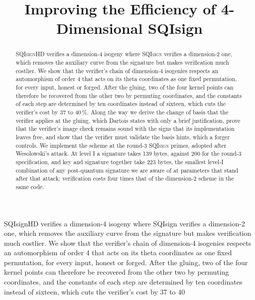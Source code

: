 \documentclass[version=preprint]{iacrcc}
\title{Improving the Efficiency of 4-Dimensional SQIsign}
\newcommand{\SQIsign}{SQI{\textsc{sign}}}
\begin{document}
    \maketitle

    \begin{textabstract}
SQIsignHD verifies a dimension-4 isogeny where SQIsign verifies a dimension-2 one, which removes the auxiliary curve from the signature but makes verification much costlier. We show that the verifier's chain of dimension-4 isogenies respects an automorphism of order 4 that acts on its theta coordinates as one fixed permutation, for every input, honest or forged. After the gluing, two of the four kernel points can therefore be recovered from the other two by permuting coordinates, and the constants of each step are determined by ten coordinates instead of sixteen, which cuts the verifier's cost by 37 to 40%
    \end{textabstract}

    \begin{abstract}
        {\SQIsign HD} verifies a dimension-4 isogeny where {\SQIsign} verifies a dimension-2 one, which removes the auxiliary curve from the signature but makes verification much costlier.
        We show that the verifier's chain of dimension-4 isogenies respects an automorphism of order 4 that acts on its theta coordinates as one fixed permutation, for every input, honest or forged. After the gluing, two of the four kernel points can therefore be recovered from the other two by permuting coordinates, and the constants of each step are determined by ten coordinates instead of sixteen, which cuts the verifier's cost by 37 to 40\,\%.
        Along the way we derive the change of basis that the verifier applies at the gluing, which Dartois states with only a brief justification, prove that the verifier's image check remains sound with the signs that its implementation leaves free, and show that the verifier must validate the basis hints, which a forger controls.
        We implement the scheme at the round-3 {\SQIsign} primes, adopted after Wesolowski's attack. At level I a signature takes 139 bytes, against 200 for the round-3 specification, and key and signature together take 223 bytes, the smallest level-I combination of any post-quantum signature we are aware of at parameters that stand after that attack; verification costs four times that of the dimension-2 scheme in the same code.
    \end{abstract}
\end{document}
